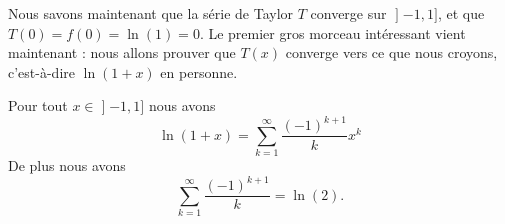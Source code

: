 	Nous savons maintenant que la série de Taylor \( T\) converge sur \( \mathopen] -1 , 1 \mathclose]\), et que \( T(0)=f(0)=\ln(1)=0\). Le premier gros morceau intéressant vient maintenant : nous allons prouver que \( T(x)\) converge vers ce que nous croyons, c'est-à-dire \( \ln(1+x)\) en personne.

\begin{proposition}     \label{PROPooKPBIooJdNsqX}
	Pour tout \( x\in\mathopen] -1 , 1 \mathclose]\) nous avons
	\begin{equation}        \label{EqweEZnV}
		\ln(1+x)=\sum_{k=1}^{\infty}\frac{ (-1)^{k+1} }{ k }x^k
	\end{equation}
	De plus nous avons
	\begin{equation}    \label{EqKUQmOZ}
		\sum_{k=1}^{\infty}\frac{ (-1)^{k+1} }{ k }=\ln(2).
	\end{equation}
\end{proposition}

